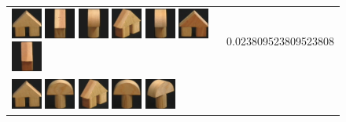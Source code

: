 \begin{figure}[!bp]
\begin{tabular}{m{11cm} | m{3cm} |}
\includegraphics[width=1cm]{coil/beeld-42.eps}
\includegraphics[width=1cm]{coil/beeld-47.eps}
\includegraphics[width=1cm]{coil/beeld-5.eps}
\includegraphics[width=1cm]{coil/beeld-45.eps}
\includegraphics[width=1cm]{coil/beeld-2.eps}
\includegraphics[width=1cm]{coil/beeld-43.eps}
\includegraphics[width=1cm]{coil/beeld-44.eps}
& {\scriptsize 0.023809523809523808}
\\
\includegraphics[width=1cm]{coil/beeld-42.eps}
\includegraphics[width=1cm]{coil/beeld-0.eps}
\includegraphics[width=1cm]{coil/beeld-45.eps}
\includegraphics[width=1cm]{coil/beeld-1.eps}
\includegraphics[width=1cm]{coil/beeld-3.eps}

\end{tabular}
\end{figure}
